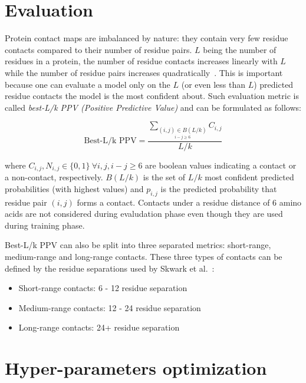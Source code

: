 \section{Evaluation}

  Protein contact maps are imbalanced by nature: they contain very few residue contacts compared to their number of residue pairs.
  $L$ being the number of residues in a protein, the number of residue contacts increases linearly with $L$ while the number of residue pairs
  increases quadratically~\cite{OLMEA1997S25}. This is important because one can evaluate a model only on the $L$ (or even less than $L$) predicted
  residue contacts the model is the most confident about. Such evaluation metric is called \textit{best-L/k PPV (Positive Predictive Value)}
  and can be formulated as follows:

  \begin{equation}
    \text{Best-L/k PPV} = \frac{\sum_{\underset {i-j \geq 6}{(i, j) \in B(L/k)}} C_{i, j}}{L/k}
  \end{equation}

  where $C_{i, j}, N_{i, j} \in \{0, 1\} \ \forall i, j, i-j \ge 6$ are boolean values indicating a contact or a non-contact, respectively.
  $B(L/k)$ is the set of $L/k$ most confident predicted probabilities (with highest values) and $p_{i, j}$ is the predicted probability
  that residue pair $(i, j)$ forms a contact.
  Contacts under a residue distance of 6 amino acids are not considered during evaludation phase even though they are used during
  training phase.

  Best-L/k PPV can also be split into three separated metrics: short-range, medium-range and long-range contacts.
  These three types of contacts can be defined by the residue separations used by Skwark et al.~\cite{10.1371/journal.pcbi.1003889}:

  \begin{itemize}
    \item Short-range contacts: 6 - 12 residue separation
    \item Medium-range contacts: 12 - 24 residue separation
    \item Long-range contacts: 24+ residue separation
  \end{itemize}

\section{Hyper-parameters optimization}

